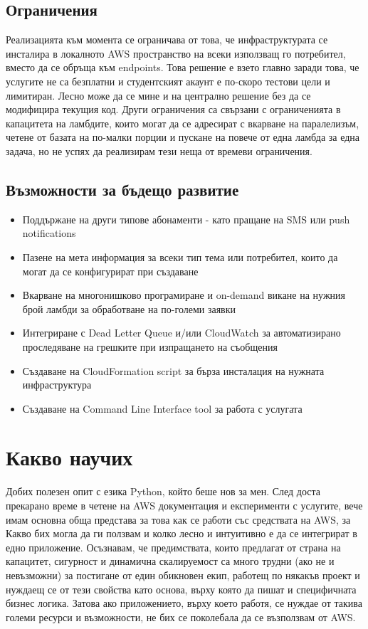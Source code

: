 \documentclass[12pt]{article}
\begin{document}
\medskip

\subsection{Ограничения} 
Реализацията към момента се ограничава от това, че инфраструктурата се инсталира в
локалното AWS пространство на всеки използващ го потребител, вместо да се обръща към
endpoints. Това решение е взето главно заради това, че услугите не са безплатни и студентският
акаунт е по-скоро тестови цели и лимитиран. Лесно може да се мине и на централно решение без да 
се модифицира текущия код. Други ограничения са свързани с ограниченията в капацитета на ламбдите,
които могат да се адресират с вкарване на паралелизъм, четене от базата на по-малки порции и 
пускане на повече от една ламбда за една задача, но не успях да реализирам тези неща от времеви
ограничения.

\subsection{Възможности за бъдещо развитие}
\begin{itemize}
  \item Поддържане на други типове абонаменти - като пращане на SMS или push notifications
  \item Пазене на мета информация за всеки тип тема или потребител, които да могат да се конфигурират при създаване
  \item Вкарване на многонишково програмиране и on-demand викане на нужния брой ламбди за обработване на по-големи заявки
  \item Интегриране с Dead Letter Queue и/или CloudWatch за автоматизирано проследяване на грешките при изпращането на съобщения
  \item Създаване на CloudFormation script за бърза инсталация на нужната инфраструктура
  \item Създаване на Command Line Interface tool за работа с услугата
\end{itemize}

\section{Какво научих}
Добих полезен опит с езика Python, който беше нов за мен.
След доста прекарано време в четене на AWS документация и експерименти с услугите,
вече имам основна обща представа за това как се работи със средствата на AWS, за Какво
бих могла да ги ползвам и колко лесно и интуитивно е да се интегрират в едно приложение.
Осъзнавам, че предимствата, които предлагат от страна на капацитет, сигурност и динамична 
скалируемост са много трудни (ако не и невъзможни) за постигане от един обикновен екип, работещ
по някакъв проект и нуждаещ се от тези свойства като основа, върху която да пишат и специфичната
бизнес логика. Затова ако приложението, върху което работя, се нуждае от такива големи ресурси и
възможности, не бих се поколебала да се възползвам от AWS.
\end{document}
